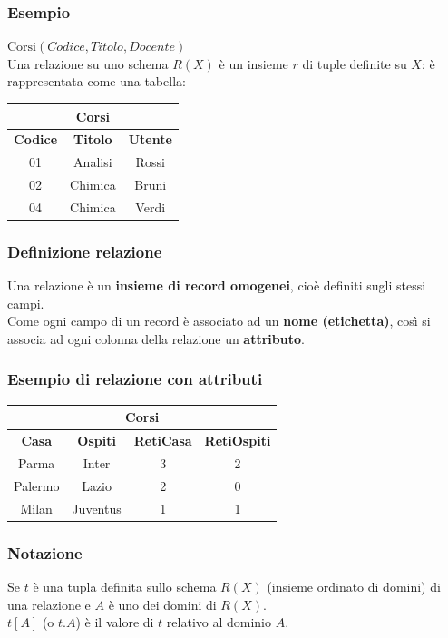 \documentclass[../main.tex]{subfiles}
\begin{document}
	\subsubsection{Esempio}
	$\text{Corsi}(Codice, Titolo, Docente)$\\
	Una relazione su uno schema $R(X)$ è un insieme $r$ di tuple definite su $X$: è rappresentata come una tabella:
	\begin{center}
		\begin{tabular}{ |c|c|c| }
			\hline
			\multicolumn{3}{|c|}{\textbf{Corsi}}\\
			\hline
			\textbf{Codice} & \textbf{Titolo} & \textbf{Utente}\\
			\hline
			01 & Analisi & Rossi\\
			02 & Chimica & Bruni\\
			04 & Chimica & Verdi\\
			\hline
		\end{tabular}
	\end{center}
	\subsubsection{Definizione relazione}
	Una relazione è un \textbf{insieme di record omogenei}, cioè definiti sugli stessi campi.\\
	Come ogni campo di un record è associato ad un \textbf{nome (etichetta)}, così si associa ad ogni colonna della relazione un \textbf{attributo}.
	\subsubsection{Esempio di relazione con attributi}
	\begin{center}
		\begin{tabular}{ |c|c|c|c| }
			\hline
			\multicolumn{4}{|c|}{\textbf{Corsi}}\\
			\hline
			\textbf{Casa} & \textbf{Ospiti} & \textbf{RetiCasa} & \textbf{RetiOspiti}\\
			\hline
			Parma & Inter & 3 & 2 \\
			Palermo &Lazio & 2 & 0\\
			Milan & Juventus & 1 & 1\\
			\hline
		\end{tabular}
	\end{center}
	\subsubsection{Notazione}
	Se $t$ è una tupla definita sullo schema $R(X)$ (insieme ordinato di domini) di una relazione e $A$ è uno dei domini di $R(X)$.\\
	$t[A]$ (o $t.A$) è il valore di $t$ relativo al dominio $A$.
\end{document}
